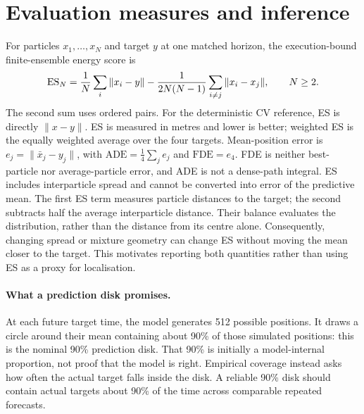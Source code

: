 \section{Evaluation measures and inference}
For particles $x_1,\ldots,x_N$ and target $y$ at one matched horizon, the
execution-bound finite-ensemble energy score is
\begin{equation}\label{eq:finite-es}
 \operatorname{ES}_N=\frac1N\sum_i\|x_i-y\|
       -\frac1{2N(N-1)}\sum_{i\ne j}\|x_i-x_j\|,\qquad N\geq2.
\end{equation}
The second sum uses ordered pairs. For the deterministic CV reference,
ES is directly $\|x-y\|$. ES is measured in metres and lower is better;
weighted ES is the equally weighted average over the four targets.
Mean-position error is $e_j=\|\bar x_j-y_j\|$, with
$\mathrm{ADE}=\tfrac14\sum_j e_j$ and $\mathrm{FDE}=e_4$.
FDE is neither best-particle nor average-particle error, and ADE is not a
dense-path integral. ES includes interparticle spread and cannot be
converted into error of the predictive mean.
The first ES term measures particle distances to the target; the second
subtracts half the average interparticle distance. Their balance evaluates
the distribution, rather than the distance from its centre alone.
Consequently, changing spread or mixture geometry can change ES without
moving the mean closer to the target. This motivates reporting both
quantities rather than using ES as a proxy for localisation.

\paragraph{What a prediction disk promises.}
At each future target time, the model generates 512 possible positions.
It draws a circle around their mean containing about 90\% of those
simulated positions: this is the nominal 90\% prediction disk. That 90\%
is initially a model-internal proportion, not proof that the model is right.
Empirical coverage instead asks how often the actual target falls inside
the disk. A reliable 90\% disk should contain actual targets about 90\%
of the time across comparable repeated forecasts.

